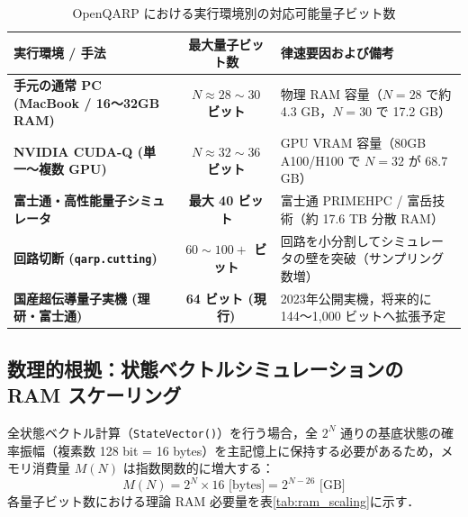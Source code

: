 \documentclass[11pt,a4paper]{ltjsarticle}
\begin{document}
\begin{table}[H]
\centering
\small
\caption{OpenQARP における実行環境別の対応可能量子ビット数}
\label{tab:qubit_limits}
\vspace{1mm}
\begin{tabularx}{\textwidth}{lcX}
\toprule
\textbf{実行環境 / 手法} & \textbf{最大量子ビット数} & \textbf{律速要因および備考} \\
\midrule
\textbf{手元の通常 PC (MacBook / 16〜32GB RAM)} & \textbf{$N \approx 28 \sim 30$ ビット} & 物理 RAM 容量（$N=28$ で約 4.3 GB，$N=30$ で 17.2 GB） \\
\textbf{NVIDIA CUDA-Q (単一〜複数 GPU)} & \textbf{$N \approx 32 \sim 36$ ビット} & GPU VRAM 容量（80GB A100/H100 で $N=32$ が 68.7 GB） \\
\textbf{富士通・高性能量子シミュレータ} & \textbf{最大 40 ビット} & 富士通 PRIMEHPC / 富岳技術（約 17.6 TB 分散 RAM） \\
\textbf{回路切断 (\texttt{qarp.cutting})} & \textbf{$60 \sim 100+$ ビット} & 回路を小分割してシミュレータの壁を突破（サンプリング数増） \\
\textbf{国産超伝導量子実機 (理研・富士通)} & \textbf{64 ビット (現行)} & 2023年公開実機，将来的に 144〜1,000 ビットへ拡張予定 \\
\bottomrule
\end{tabularx}
\end{table}

\subsection{数理的根拠：状態ベクトルシミュレーションの RAM スケーリング}
全状態ベクトル計算（\texttt{StateVector()}）を行う場合，全 $2^N$ 通りの基底状態の確率振幅（複素数 128 bit = 16 bytes）を主記憶上に保持する必要があるため，メモリ消費量 $M(N)$ は指数関数的に増大する：
\begin{equation}
    M(N) = 2^N \times 16 \text{ [bytes]} = 2^{N-26} \text{ [GB]}
\end{equation}
各量子ビット数における理論 RAM 必要量を表\ref{tab:ram_scaling}に示す．
\end{document}
